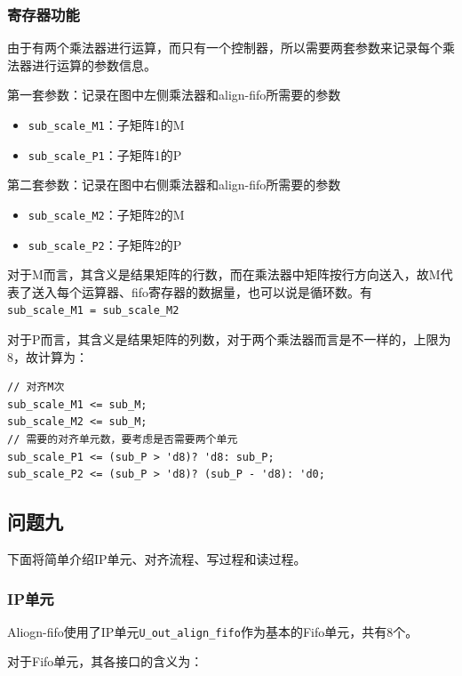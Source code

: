 \documentclass[12pt,a4paper]{article}
\begin{document}
\subsubsection{寄存器功能}

由于有两个乘法器进行运算，而只有一个控制器，所以需要两套参数来记录每个乘法器进行运算的参数信息。

第一套参数：记录在图中左侧乘法器和align-fifo所需要的参数

\begin{itemize}
\item
  \texttt{sub\_scale\_M1}：子矩阵1的M
\item
  \texttt{sub\_scale\_P1}：子矩阵1的P
\end{itemize}

第二套参数：记录在图中右侧乘法器和align-fifo所需要的参数

\begin{itemize}
\item
  \texttt{sub\_scale\_M2}：子矩阵2的M
\item
  \texttt{sub\_scale\_P2}：子矩阵2的P
\end{itemize}

对于M而言，其含义是结果矩阵的行数，而在乘法器中矩阵按行方向送入，故M代表了送入每个运算器、fifo寄存器的数据量，也可以说是循环数。有\texttt{sub\_scale\_M1\ =\ sub\_scale\_M2}

对于P而言，其含义是结果矩阵的列数，对于两个乘法器而言是不一样的，上限为8，故计算为：

\begin{lstlisting}
// 对齐M次
sub_scale_M1 <= sub_M;
sub_scale_M2 <= sub_M;
// 需要的对齐单元数，要考虑是否需要两个单元
sub_scale_P1 <= (sub_P > 'd8)? 'd8: sub_P;
sub_scale_P2 <= (sub_P > 'd8)? (sub_P - 'd8): 'd0;
\end{lstlisting}

\subsection{问题九}

下面将简单介绍IP单元、对齐流程、写过程和读过程。

\subsubsection{IP单元}

Aliogn-fifo使用了IP单元\texttt{U\_out\_align\_fifo}作为基本的Fifo单元，共有8个。

对于Fifo单元，其各接口的含义为：
\end{document}
